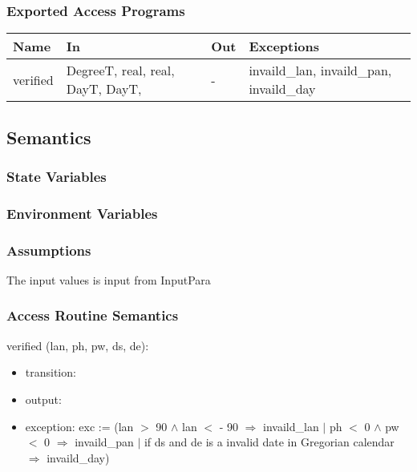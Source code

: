 \documentclass[12pt, titlepage]{article}
\begin{document}
\subsubsection{Exported Access Programs}

\begin{center}
\begin{tabular}{p{2cm} p{5cm} p{2cm} p{5cm}}
\hline
\textbf{Name} & \textbf{In} & \textbf{Out} & \textbf{Exceptions} \\
\hline 
verified & DegreeT, real, real, DayT, DayT, & - & invaild\_lan, invaild\_pan, invaild\_day \\
\hline
\end{tabular}
\end{center}


\subsection{Semantics}

\subsubsection{State Variables}



\subsubsection{Environment Variables}


\subsubsection{Assumptions}
The input values is input from InputPara


\subsubsection{ Access Routine Semantics}

\noindent  verified (lan, ph, pw, ds, de):
\begin{itemize}
\item transition: 

\item output:
\item exception: exc := 
(lan $>	$ 90 $\wedge$ lan $<$ - 90 $\Rightarrow$ invaild\_lan
$|$
ph $<$ 0 $\wedge$ pw $<$ 0 $\Rightarrow$ invaild\_pan
$|$
if ds and de is a invalid date in Gregorian calendar $\Rightarrow$ invaild\_day)
\end{itemize}
\end{document}
